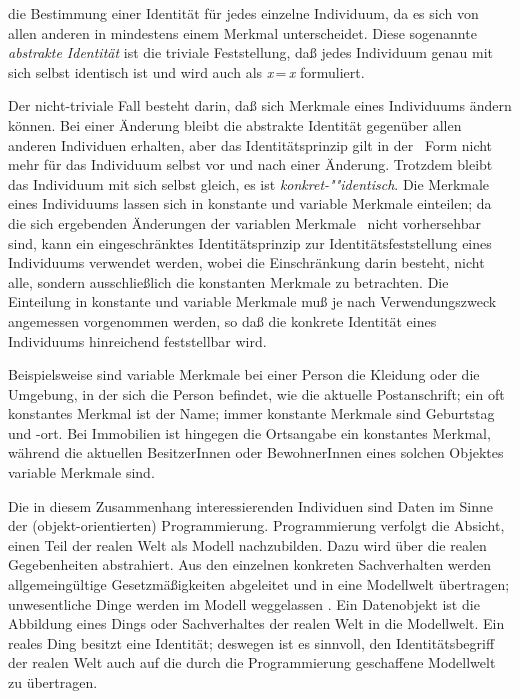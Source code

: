 die Bestimmung einer Identit\"{a}t f\"{u}r jedes einzelne Individuum, da es
sich von allen anderen in mindestens einem Merkmal
unterscheidet. Diese sogenannte {\em abstrakte Identit\"{a}t\/} ist die
triviale Feststellung, da\ss{} jedes Individuum genau mit sich selbst
identisch ist und wird auch als {\it x}\,=\,{\it x} formuliert.
%
\par{}Der nicht-triviale Fall besteht darin, da\ss{} sich Merkmale
eines Individuums \"{a}ndern k\"{o}nnen. Bei einer \"{A}nderung bleibt die
abstrakte Identit\"{a}t gegen\"{u}ber allen anderen Individuen erhalten,
aber das Identit\"{a}tsprinzip gilt in der \og[en]\ Form nicht mehr f\"{u}r
das Individuum selbst vor und nach einer \"{A}nderung.  Trotzdem bleibt
das Individuum mit sich selbst gleich, es ist {\em
kon\-kret-""iden\-tisch}. Die Merkmale eines Individuums lassen sich
in konstante und variable Merkmale einteilen; da die sich ergebenden
\"{A}nderungen der variablen Merkmale \ia\ nicht vorhersehbar sind, kann
ein eingeschr\"{a}nktes Identit\"{a}tsprinzip zur Identit\"{a}tsfeststellung
eines Individuums verwendet werden, wobei die Einschr\"{a}nkung darin
besteht, nicht alle, sondern ausschlie\ss{}lich die konstanten Merkmale
zu betrachten. Die Einteilung in konstante und variable Merkmale mu\ss{}
je nach Verwendungszweck angemessen vorgenommen werden, so da\ss{} die
konkrete Identit\"{a}t eines Individuums hinreichend feststellbar wird.
%
\par{}Beispielsweise sind variable Merkmale bei einer Person die
Kleidung oder die Umgebung, in der sich die Person befindet, wie die
aktuelle Postanschrift; ein oft konstantes Merkmal ist der Name; immer
konstante Merkmale sind Geburtstag und -ort. Bei Immobilien ist
hingegen die Ortsangabe ein konstantes Merkmal, w\"{a}hrend die aktuellen
BesitzerInnen oder BewohnerInnen eines solchen Objektes variable
Merkmale sind.
%
\par{}Die in diesem Zusammenhang interessierenden Individuen sind
Daten im Sinne der (objekt-orientierten) Programmierung.
Programmierung verfolgt die Absicht, einen Teil der realen Welt als
Modell nachzubilden. Dazu wird \"{u}ber die realen Gegebenheiten
abstrahiert. Aus den einzelnen konkreten Sachverhalten werden
allgemeing\"{u}ltige Gesetzm\"{a}\ss{}igkeiten abgeleitet und in eine
Modellwelt \"{u}bertragen; unwesentliche Dinge werden im Modell
weggelassen \cite[]{bib:wa89}. Ein Datenobjekt
ist die Abbildung eines Dings oder Sachverhaltes der realen Welt in
die Modellwelt. Ein reales Ding besitzt eine Identit\"{a}t; deswegen ist
es sinnvoll, den Identit\"{a}tsbegriff der realen Welt auch auf die durch
die Programmierung geschaffene Modellwelt zu \"{u}ber\-tra\-gen.
%
